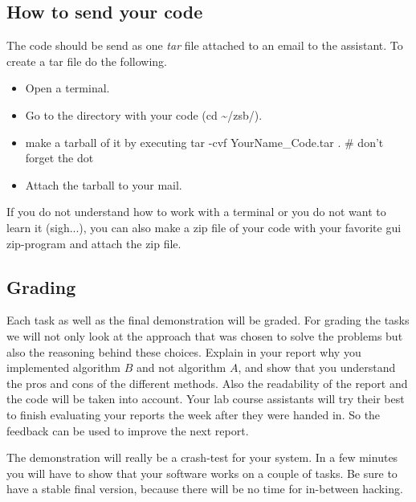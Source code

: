 \documentclass[10pt]{scrartcl}
\begin{document}

\subsection{How to send your code}
\label{subsec:Howtosendcode}
The code should be send as one {\em tar} file attached to an email to the assistant. To create a tar file do the following.
\begin{itemize}
  \item Open a terminal.
  \item Go to the directory with your code ({\ttfamily\small cd \~{}/zsb/}).
  \item make a tarball of it by executing {\ttfamily\small tar -cvf YourName\_Code.tar .} \# don't forget the dot
  \item Attach the tarball to your mail.
\end{itemize}
If you do not understand how to work with a terminal or you do not want
to learn it (sigh...), you can also make a zip file of your code with
your favorite gui zip-program and attach the zip file.

\subsection{Grading}
Each task as well as the final demonstration will be graded. 
For grading the tasks we will not only look at the approach that was
chosen to solve the problems but also the reasoning behind these
choices. Explain in your report why you implemented algorithm
$B$ and not algorithm $A$, and show that you understand the pros and
cons of the different methods. 
Also the readability of the report and the code will be taken into
account.
Your lab course assistants will try their best to finish evaluating your
reports the week after they were handed in. So the feedback can be used
to improve the next report.

The demonstration will really be a crash-test for your system. In a few
minutes you will have to show that your software works on a couple of
tasks. Be sure to have a stable final version, because there will be no
time for in-between hacking.
\end{document}
